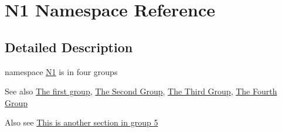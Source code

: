 \hypertarget{namespaceN1}{}\section{N1 Namespace Reference}
\label{namespaceN1}


\subsection{Detailed Description}
namespace \hyperlink{namespaceN1}{N1} is in four groups \begin{DoxySeeAlso}{See also}
\hyperlink{group__group1}{The first group}, \hyperlink{group__group2}{The Second Group}, \hyperlink{group__group3}{The Third Group}, \hyperlink{group__group4}{The Fourth Group}
\end{DoxySeeAlso}
Also see \hyperlink{group__group5}{This is another section in group 5} 